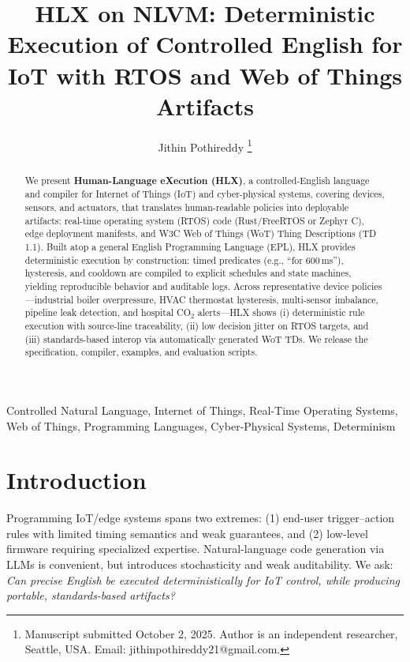 \documentclass[journal]{IEEEtran}
\begin{document}
\title{HLX on NLVM: Deterministic Execution of Controlled English for IoT with RTOS and Web of Things Artifacts}

\author{Jithin Pothireddy%
\thanks{Manuscript submitted October 2, 2025. Author is an independent researcher, Seattle, USA.  Email: jithinpothireddy21@gmail.com.}}

\maketitle

\begin{abstract}
We present \textbf{Human-Language eXecution (HLX)}, a controlled-English language and compiler for Internet of Things (IoT) and cyber-physical systems, covering devices, sensors, and actuators, that translates human-readable policies into deployable artifacts: real-time operating system (RTOS) code (Rust/FreeRTOS or Zephyr C), edge deployment manifests, and W3C Web of Things (WoT) Thing Descriptions (TD 1.1). Built atop a general English Programming Language (EPL), HLX provides deterministic execution by construction: timed predicates (e.g., “for 600\,ms”), hysteresis, and cooldown are compiled to explicit schedules and state machines, yielding reproducible behavior and auditable logs. Across representative device policies—industrial boiler overpressure, HVAC thermostat hysteresis, multi-sensor imbalance, pipeline leak detection, and hospital CO$_2$ alerts—HLX shows (i) deterministic rule execution with source-line traceability, (ii) low decision jitter on RTOS targets, and (iii) standards-based interop via automatically generated WoT TDs. We release the specification, compiler, examples, and evaluation scripts.
\end{abstract}

\begin{IEEEkeywords}
Controlled Natural Language, Internet of Things, Real-Time Operating Systems, Web of Things, Programming Languages, Cyber-Physical Systems, Determinism
\end{IEEEkeywords}

\section{Introduction}
Programming IoT/edge systems spans two extremes: (1) end-user trigger–action rules with limited timing semantics and weak guarantees, and (2) low-level firmware requiring specialized expertise. Natural-language code generation via LLMs is convenient, but introduces stochasticity and weak auditability. We ask: \emph{Can precise English be executed deterministically for IoT control, while producing portable, standards-based artifacts?}
\end{document}

